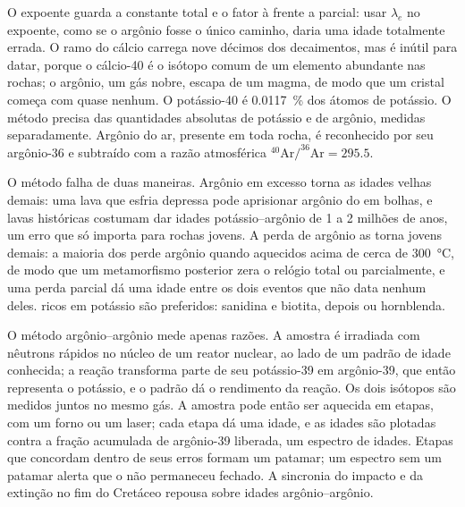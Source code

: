 O expoente guarda a constante total e o fator à frente a parcial: usar $\lambda_e$ no expoente,
como se o argônio fosse o único caminho, daria uma idade totalmente errada. O ramo do cálcio
carrega nove décimos dos decaimentos, mas é inútil para datar, porque o cálcio-40 é o isótopo
comum de um elemento abundante nas rochas; o argônio, um gás nobre, escapa de um magma, de modo
que um cristal começa com quase nenhum. O potássio-40 é \qty{0.0117}{\percent} dos átomos de
potássio. O método precisa das quantidades absolutas de potássio e de argônio, medidas
separadamente. Argônio do ar, presente em toda rocha, é reconhecido por seu argônio-36 e
subtraído com a razão atmosférica $^{40}\mathrm{Ar}/^{36}\mathrm{Ar} = 295.5$.

O método falha de duas maneiras. Argônio em excesso torna as idades velhas demais: uma lava que
esfria depressa pode aprisionar argônio do  em bolhas, e lavas históricas costumam dar
idades potássio--argônio de 1 a 2 milhões de anos, um erro que só importa para rochas jovens. A
perda de argônio as torna jovens demais: a maioria dos  perde argônio quando aquecidos
acima de cerca de \qty{300}{\celsius}, de modo que um metamorfismo posterior zera o relógio
total ou parcialmente, e uma perda parcial dá uma idade entre os dois eventos que não data
nenhum deles.  ricos em potássio são preferidos: sanidina e biotita, depois 
ou hornblenda.

O método argônio--argônio mede apenas razões. A amostra é irradiada com nêutrons rápidos no
núcleo de um reator nuclear, ao lado de um  padrão de idade conhecida; a reação
transforma parte de seu potássio-39 em argônio-39, que então representa o potássio, e o padrão
dá o rendimento da reação. Os dois isótopos são medidos juntos no mesmo gás. A amostra pode
então ser aquecida em etapas, com um forno ou um laser; cada etapa dá uma idade, e as idades
são plotadas contra a fração acumulada de argônio-39 liberada, um espectro de idades. Etapas que
concordam dentro de seus erros formam um patamar; um espectro sem um patamar alerta que o
 não permaneceu fechado. A sincronia do impacto e da extinção no fim do Cretáceo repousa
sobre idades argônio--argônio.


